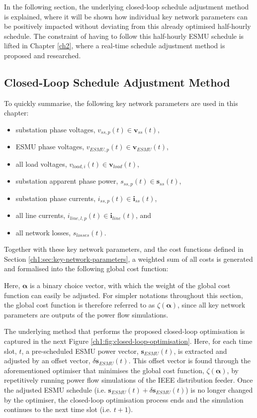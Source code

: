 In the following section, the underlying closed-loop schedule adjustment method is explained, where it will be shown how individual key network parameters can be positively impacted without deviating from this already optimised half-hourly schedule.
The constraint of having to follow this half-hourly ESMU schedule is lifted in Chapter \ref{ch2}, where a real-time schedule adjustment method is proposed and researched.

\subsection{Closed-Loop Schedule Adjustment Method}

To quickly summarise, the following key network parameters are used in this chapter:

\begin{itemize}
	\item substation phase voltages, $v_{ss,p}(t) \in \textbf{v}_{ss}(t)$,
	\item ESMU phase voltages, $v_{ESMU,p}(t) \in \textbf{v}_{ESMU}(t)$,
	\item all load voltages, $v_{load,i}(t) \in \textbf{v}_{load}(t)$,
	\item substation apparent phase power, $s_{ss,p}(t) \in \textbf{s}_{ss}(t)$,
	\item substation phase currents, $i_{ss,p}(t) \in \textbf{i}_{ss}(t)$,
	\item all line currents, $i_{line,l,p}(t) \in \textbf{i}_{line}(t)$, and
	\item all network losses, $s_{losses}(t)$.
\end{itemize}

Together with these key network parameters, and the cost functions defined in Section \ref{ch1:sec:key-network-parameters}, a weighted sum of all costs is generated and formalised into the following global cost function:



Here, $\boldsymbol{\alpha}$ is a binary choice vector, with which the weight of the global cost function can easily be adjusted.
For simpler notations throughout this section, the global cost function is therefore referred to as $\zeta(\boldsymbol{\alpha})$, since all key network parameters are outputs of the power flow simulations.



The underlying method that performs the proposed closed-loop optimisation is captured in the next Figure \ref{ch1:fig:closed-loop-optimisation}.
Here, for each time slot, $t$, a pre-scheduled ESMU power vector, $\textbf{s}_{ESMU}(t)$, is extracted and adjusted by an offset vector, $\delta \textbf{s}_{ESMU}(t)$.
This offset vector is found through the aforementioned optimiser that minimises the global cost function, $\zeta(\boldsymbol{\alpha})$, by repetitively running power flow simulations of the IEEE distribution feeder.
Once the adjusted ESMU schedule (i.e. $\textbf{s}_{ESMU}(t) + \delta \textbf{s}_{ESMU}(t)$) is no longer changed by the optimiser, the closed-loop optimisation process ends and the simulation continues to the next time slot (i.e. $t+1$).

